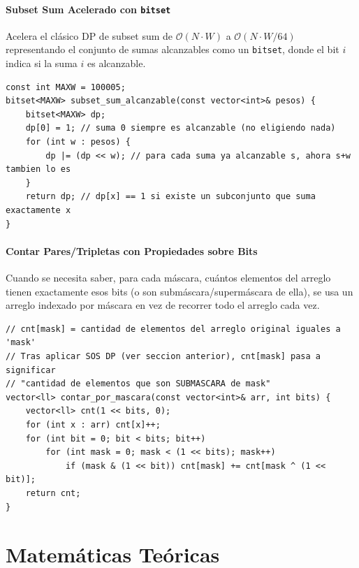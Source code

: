 \documentclass[10pt,twocolumn,letterpaper]{report}
\begin{document}
\subsubsection{Subset Sum Acelerado con \texttt{bitset}}
Acelera el clásico DP de subset sum de $\mathcal{O}(N \cdot W)$ a $\mathcal{O}(N \cdot W / 64)$ representando el conjunto de sumas alcanzables como un \texttt{bitset}, donde el bit $i$ indica si la suma $i$ es alcanzable.
\begin{lstlisting}
const int MAXW = 100005;
bitset<MAXW> subset_sum_alcanzable(const vector<int>& pesos) {
    bitset<MAXW> dp;
    dp[0] = 1; // suma 0 siempre es alcanzable (no eligiendo nada)
    for (int w : pesos) {
        dp |= (dp << w); // para cada suma ya alcanzable s, ahora s+w tambien lo es
    }
    return dp; // dp[x] == 1 si existe un subconjunto que suma exactamente x
}
\end{lstlisting}
\subsubsection{Contar Pares/Tripletas con Propiedades sobre Bits}
Cuando se necesita saber, para cada máscara, cuántos elementos del arreglo tienen exactamente esos bits (o son submáscara/supermáscara de ella), se usa un arreglo indexado por máscara en vez de recorrer todo el arreglo cada vez.
\begin{lstlisting}
// cnt[mask] = cantidad de elementos del arreglo original iguales a 'mask'
// Tras aplicar SOS DP (ver seccion anterior), cnt[mask] pasa a significar
// "cantidad de elementos que son SUBMASCARA de mask"
vector<ll> contar_por_mascara(const vector<int>& arr, int bits) {
    vector<ll> cnt(1 << bits, 0);
    for (int x : arr) cnt[x]++;
    for (int bit = 0; bit < bits; bit++)
        for (int mask = 0; mask < (1 << bits); mask++)
            if (mask & (1 << bit)) cnt[mask] += cnt[mask ^ (1 << bit)];
    return cnt;
}
\end{lstlisting}
\chapter{Matemáticas Teóricas}
\end{document}
